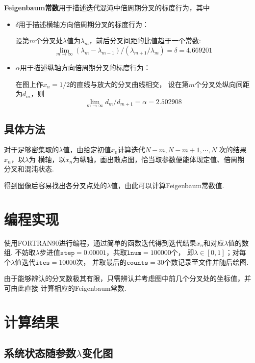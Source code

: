 \documentclass[12pt,a4paper,utf8]{ctexart}
\begin{document}
\textbf{Feigenbaum常数}用于描述迭代混沌中倍周期分叉的标度行为，其中
\begin{itemize}
    \item $\delta$用于描述横轴方向倍周期分叉的标度行为：

        设第$m$个分叉处$\lambda$值为$\lambda_m$，前后分叉间距的比值趋于一个常数:
        \begin{equation}
            \lim_{m\rightarrow \infty} (\lambda_m -
            \lambda_{m-1})/(\lambda_{m+1}/\lambda_m) = \delta
            = 4.669201
        \end{equation}

    \item $\alpha$用于描述纵轴方向倍周期分叉的标度行为：

        在图上作$x_n=1/2$的直线与放大的分叉曲线相交，
        设在第$m$个分叉处纵向间距为$d_m$，则
        \begin{equation}
            \lim_{m\rightarrow \infty} d_m/d_{m+1} = \alpha = 2.502908
        \end{equation}
\end{itemize}

\subsection{具体方法}

对于足够密集取的$\lambda$值，由给定初值$x_0$计算迭代$N-m,N-m+1,\cdots,N$
次的结果$x_n$，以$\lambda$为
横轴，以$x_n$为纵轴，画出散点图，恰当取参数便能体现定值、倍周期分叉和混沌状态.

得到图像后容易找出各分叉点处的$\lambda$值，由此可以计算Feigenbaum常数值.
\section{编程实现}

使用FORTRAN90进行编程，通过简单的函数迭代得到迭代结果$x_n$和对应$\lambda$值的数组.
不妨取$\lambda$步进值$ \mathtt{step}=0.00001$，共取$\mathtt{lnum}=100000$个，
即$\lambda \in [0,1]$；对每个$\lambda$值迭代$\mathtt{ites}=10000$次，
并取最后的$\mathtt{counts}=30$个数记录至文件并随后绘图.

由于能够辨认的分叉数极其有限，只需辨认并考虑图中前几个分叉处的坐标值，并可由此直接
计算相应的Feigenbaum常数.
\section{计算结果}
\subsection{系统状态随参数$\lambda$变化图}
\end{document}
